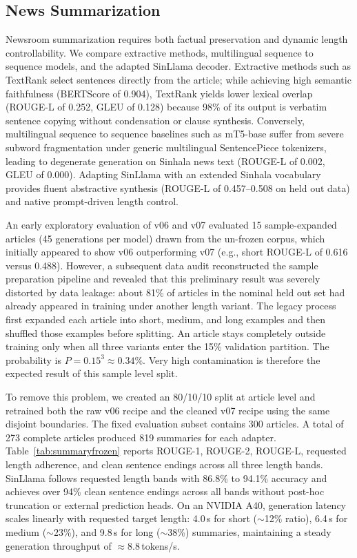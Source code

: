 \documentclass[a4paper,conference]{IEEEtran}
\begin{document}
\subsection{News Summarization}
Newsroom summarization requires both factual preservation and dynamic length
controllability. We compare extractive methods, multilingual sequence to sequence
models, and the adapted SinLlama decoder. Extractive methods such as TextRank select
sentences directly from the article; while achieving high semantic faithfulness
(BERTScore of 0.904), TextRank yields lower lexical overlap (ROUGE-L of 0.252, GLEU of
0.128) because 98\% of its output is verbatim sentence copying without condensation or
clause synthesis. Conversely, multilingual sequence to sequence baselines such as
mT5-base suffer from severe subword fragmentation under generic multilingual
SentencePiece tokenizers, leading to degenerate generation on Sinhala news text
(ROUGE-L of 0.002, GLEU of 0.000). Adapting SinLlama with an extended Sinhala
vocabulary provides fluent abstractive synthesis (ROUGE-L of 0.457--0.508 on held out
data) and native prompt-driven length control.

An early exploratory evaluation of v06 and v07 evaluated 15 sample-expanded
articles (45 generations per model) drawn from the un-frozen corpus, which
initially appeared to show v06 outperforming v07 (e.g., short ROUGE-L of
0.616 versus 0.488). However, a subsequent data audit reconstructed the sample
preparation pipeline and revealed that this preliminary result was severely
distorted by data leakage: about 81\% of articles in the nominal held out set
had already appeared in training under another length variant. The legacy
process first expanded each article into short, medium, and long examples and
then shuffled those examples before splitting. An article stays completely
outside training only when all three variants enter the 15\% validation partition.
The probability is $P = 0.15^3 \approx 0.34\%$. Very high contamination is
therefore the expected result of this sample level split.

To remove this problem, we created an 80/10/10 split at article level and
retrained both the raw v06 recipe and the cleaned v07 recipe using the same
disjoint boundaries. The fixed evaluation subset contains 300 articles. A
total of 273 complete articles produced 819 summaries for each adapter.
Table~\ref{tab:summaryfrozen} reports ROUGE-1, ROUGE-2, ROUGE-L, requested length
adherence, and clean sentence endings across all three length bands. SinLlama
follows requested length bands with 86.8\% to 94.1\% accuracy and achieves over
94\% clean sentence endings across all bands without post-hoc truncation or external
prediction heads. On an NVIDIA A40, generation latency scales linearly with requested
target length: 4.0\,s for short ($\sim$12\% ratio), 6.4\,s for medium ($\sim$23\%), and
9.8\,s for long ($\sim$38\%) summaries, maintaining a steady generation throughput of
$\approx 8.8$\,tokens/s.
\end{document}

